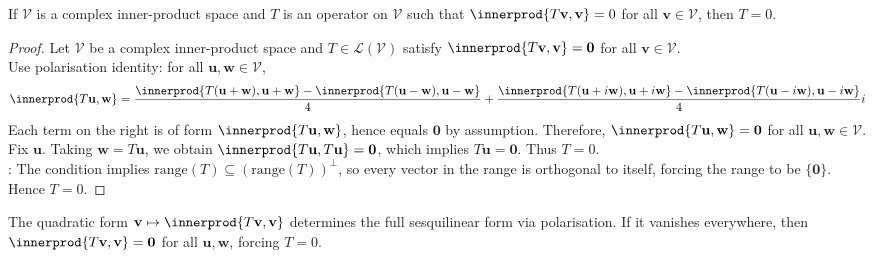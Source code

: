 \begin{proposition} \label{prop:complexinnerprodzero} If $\mathcal{V}$ is a complex inner-product space and $T$ is an operator on $\mathcal{V}$ such that $\innerprod{T \mathbf{v}, \mathbf{v}} = 0$ for all $\mathbf{v} \in \mathcal{V}$, then $T = 0$.
\begin{proof} Let $\mathcal{V}$ be a complex inner-product space and $T \in \mathcal{L}(\mathcal{V})$ satisfy $\innerprod{T \mathbf{v}, \mathbf{v}} = \mathbf{0}$ for all $\mathbf{v} \in \mathcal{V}$.\\
Use polarisation identity: for all $\mathbf{u}, \mathbf{w} \in \mathcal{V}$,
\begin{align}
\innerprod{T \mathbf{u}, \mathbf{w}} = \frac{\innerprod{T(\mathbf{u} + \mathbf{w}), \mathbf{u} + \mathbf{w}} - \innerprod{T(\mathbf{u} - \mathbf{w}), \mathbf{u} - \mathbf{w}}}{4} + \frac{\innerprod{T(\mathbf{u} + i\mathbf{w}), \mathbf{u} + i \mathbf{w}} - \innerprod{T(\mathbf{u} - i\mathbf{w}), \mathbf{u} - i \mathbf{w}}}{4}i \nonumber
\end{align}
Each term on the right is of form $\innerprod{T \mathbf{u}, \mathbf{w}}$, hence equals $\mathbf{0}$ by assumption. Therefore, $\innerprod{T \mathbf{u}, \mathbf{w}} = \mathbf{0}$ for all $\mathbf{u}, \mathbf{w} \in \mathcal{V}$. Fix $\mathbf{u}$. Taking $\mathbf{w} = T \mathbf{u}$, we obtain $\innerprod{T \mathbf{u}, T \mathbf{u}} = \mathbf{0}$, which implies $T \mathbf{u} = \mathbf{0}$. Thus $T = 0$.\\
: The condition implies $\text{range}(T) \subseteq (\text{range}(T))^{\perp}$, so every vector in the range is orthogonal to itself, forcing the range to be $\{ \mathbf{0} \}$. Hence $T = 0$.
\end{proof}
\end{proposition}

The quadratic form $\mathbf{v} \mapsto \innerprod{T \mathbf{v}, \mathbf{v}}$ determines the full sesquilinear form via polarisation. If it vanishes everywhere, then $\innerprod{T \mathbf{v}, \mathbf{v}} = \mathbf{0}$ for all $\mathbf{u}, \mathbf{w}$, forcing $T = 0$.

